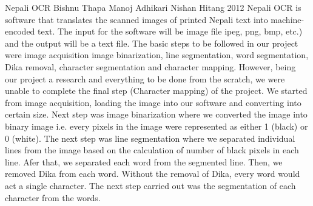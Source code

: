  \begin{conf-abstract}[]
{Nepali OCR}
{
	Bishnu Thapa
	Manoj Adhikari
	Nishan Hitang
}
{2012}
Nepali OCR is software that translates the scanned images of printed
Nepali text into machine-encoded text. The input for the software will be
image file ipeg, png, bmp, etc.) and the output will be a text file.
The basic steps to be followed in our project were image acquisition
image binarization, line segmentation, word segmentation, Dika removal,
character segmentation and character mapping. However, being our
project a research and everything to be done from the scratch, we were
unable to complete the final step (Character mapping) of the project.
We started from image acquisition, loading the image into our software
and converting into certain size. Next step was image binarization where
we converted the image into binary image i.e. every pixels in the image
were represented as either 1 (black) or 0 (white). The next step was line
segmentation where we separated individual lines from the image based
on the calculation of number of black pixels in each line. Afer that, we
separated each word from the segmented line. Then, we removed Dika
from each word. Without the removal of Dika, every word would act a
single character. The next step carried out was the segmentation of each
character from the words.
  \end{conf-abstract}